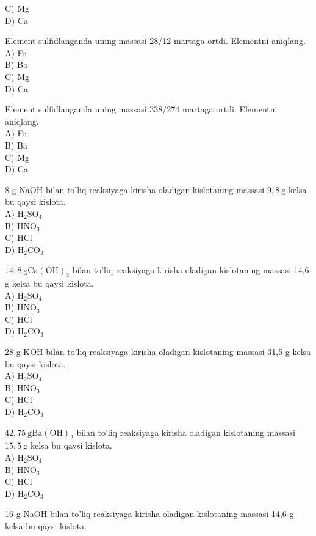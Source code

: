 C) Mg\\
D) Ca
  \item Element sulfidlanganda uning massasi 28/12 martaga ortdi. Elementni aniqlang.\\
A) Fe\\
B) Ba\\
C) Mg\\
D) Ca
  \item Element sulfidlanganda uning massasi 338/274 martaga ortdi. Elementni aniqlang.\\
A) Fe\\
B) Ba\\
C) Mg\\
D) Ca
  \item 8 g NaOH bilan to'liq reaksiyaga kirisha oladigan kislotaning massasi $9,8 \mathrm{~g}$ kelsa bu qaysi kislota.\\
A) $\mathrm{H}_{2} \mathrm{SO}_{4}$\\
B) $\mathrm{HNO}_{3}$\\
C) HCl\\
D) $\mathrm{H}_{2} \mathrm{CO}_{3}$
  \item $14,8 \mathrm{~g} \mathrm{Ca}(\mathrm{OH})_{2}$ bilan to'liq reaksiyaga kirisha oladigan kislotaning massasi 14,6 g kelsa bu qaysi kislota.\\
A) $\mathrm{H}_{2} \mathrm{SO}_{4}$\\
B) $\mathrm{HNO}_{3}$\\
C) HCl\\
D) $\mathrm{H}_{2} \mathrm{CO}_{3}$
  \item 28 g KOH bilan to'liq reaksiyaga kirisha oladigan kislotaning massasi 31,5 g kelsa bu qaysi kislota.\\
A) $\mathrm{H}_{2} \mathrm{SO}_{4}$\\
B) $\mathrm{HNO}_{3}$\\
C) HCl\\
D) $\mathrm{H}_{2} \mathrm{CO}_{3}$
  \item $42,75 \mathrm{~g} \mathrm{Ba}(\mathrm{OH})_{2}$ bilan to'liq reaksiyaga kirisha oladigan kislotaning massasi $15,5 \mathrm{~g}$ kelsa bu qaysi kislota.\\
A) $\mathrm{H}_{2} \mathrm{SO}_{4}$\\
B) $\mathrm{HNO}_{3}$\\
C) HCl\\
D) $\mathrm{H}_{2} \mathrm{CO}_{3}$
  \item 16 g NaOH bilan to'liq reaksiyaga kirisha oladigan kislotaning massasi 14,6 g kelsa bu qaysi kislota.\\

